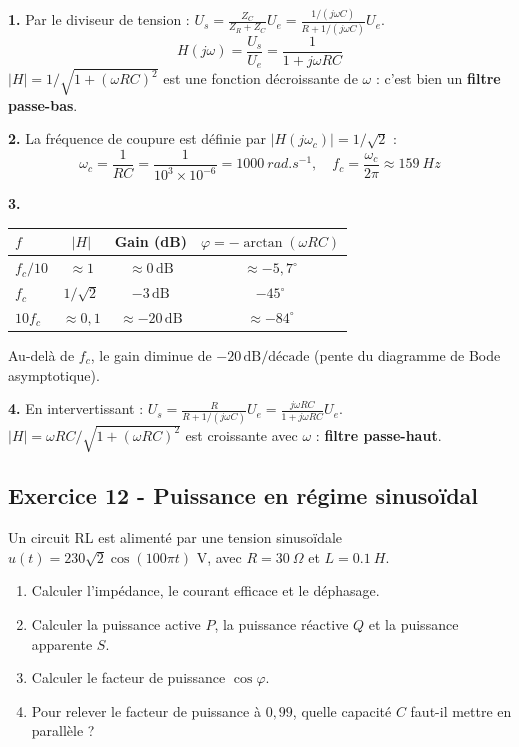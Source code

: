 \documentclass[12pt,a4paper]{article}
\begin{document}
\begin{boitecorrige}
\textbf{1.} Par le diviseur de tension : $U_s = \frac{Z_C}{Z_R+Z_C}U_e = \frac{1/(j\omega C)}{R+1/(j\omega C)}U_e$.
\[
H(j\omega) = \frac{U_s}{U_e} = \frac{1}{1+j\omega RC}
\]
$|H| = 1/\sqrt{1+(\omega RC)^2}$ est une fonction décroissante de $\omega$ : c'est bien un \textbf{filtre passe-bas}.

\textbf{2.} La fréquence de coupure est définie par $|H(j\omega_c)| = 1/\sqrt{2}$ :
\[
\omega_c = \frac{1}{RC} = \frac{1}{10^3\times10^{-6}} = \qty{1000}{rad.s^{-1}}, \quad f_c = \frac{\omega_c}{2\pi} \approx \qty{159}{Hz}
\]

\textbf{3.}
\begin{center}
\begin{tabular}{lccc}
\toprule
$f$ & $|H|$ & Gain (dB) & $\varphi = -\arctan(\omega RC)$\\
\midrule
$f_c/10$ & $\approx1$ & $\approx0\,\text{dB}$ & $\approx -5{,}7^\circ $\\
$f_c$ & $1/\sqrt{2}$ & $-3\,\text{dB}$ & $-45^\circ $\\
$10f_c$ & $\approx0{,}1$ & $\approx-20\,\text{dB}$ & $\approx -84^\circ $\\
\bottomrule
\end{tabular}
\end{center}
Au-delà de $f_c$, le gain diminue de $-20\,\text{dB/décade}$ (pente du diagramme de Bode asymptotique).

\textbf{4.} En intervertissant : $U_s = \frac{R}{R+1/(j\omega C)}U_e = \frac{j\omega RC}{1+j\omega RC}U_e$.
$|H| = \omega RC/\sqrt{1+(\omega RC)^2}$ est croissante avec $\omega$ : \textbf{filtre passe-haut}.
\end{boitecorrige}

\subsection*{Exercice 12 - Puissance en régime sinusoïdal \niveau{\moyen}}

\begin{boiteexercice}
Un circuit RL est alimenté par une tension sinusoïdale $u(t) = 230\sqrt{2}\cos(100\pi t)$ V, avec $R=\qty{30}{\Omega}$ et $L = \qty{0.1}{H}$.
\begin{enumerate}
  \item Calculer l'impédance, le courant efficace et le déphasage.
  \item Calculer la puissance active $P$, la puissance réactive $Q$ et la puissance apparente $S$.
  \item Calculer le facteur de puissance $\cos\varphi$.
  \item Pour relever le facteur de puissance à $0{,}99$, quelle capacité $C$ faut-il mettre en parallèle ?
\end{enumerate}
\end{boiteexercice}
\end{document}
